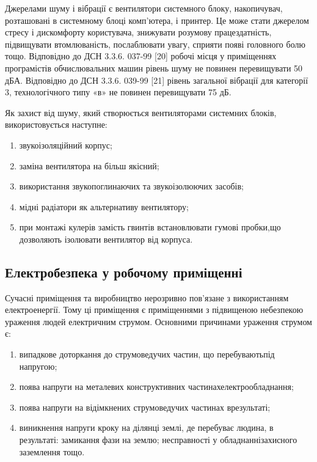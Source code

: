 Джерелами шуму і вібрації є вентилятори системного блоку, накопичувач, розташовані в системному блоці комп’ютера, і принтер. Це може стати джерелом стресу і дискомфорту користувача, знижувати розумову працездатність, підвищувати втомлюваність, послаблювати увагу, сприяти появі головного болю тощо. Відповідно до ДСН 3.3.6. 037-99 [20] робочі місця у приміщеннях програмістів обчислювальних машин рівень шуму не повинен перевищувати 50 дБА. Відповідно до ДСН 3.3.6. 039-99 [21] рівень загальної вібрації для категорії 3, технологічного типу «в» не повинен перевищувати 75 дБ.

Як захист від шуму, який створюється вентиляторами системних блоків, використовується наступне:

\begin{enumerate}
	\item звукоізоляційний корпус;
	\item заміна вентилятора на більш якісний;
	\item використання звукопоглинаючих та звукоізолюючих засобів;
	\item мідні радіатори як альтернативу вентилятору;
	\item при монтажі кулерів замість гвинтів встановлювати гумові пробки,\newline \hspace*{-18mm}що дозволяють ізолювати вентилятор від корпуса.
\end{enumerate}

\subsection{Електробезпека у робочому приміщенні}

Сучасні приміщення та виробництво нерозривно пов’язане з використанням електроенергії. Тому ці приміщення є приміщеннями з підвищеною небезпекою ураження людей електричним струмом. Основними причинами ураження струмом є:

\begin{enumerate}
	\item випадкове доторкання до струмоведучих частин, що перебувають\newline \hspace*{-18mm}під напругою;
	\item поява напруги на металевих конструктивних частинах\newline \hspace*{-18mm}електрообладнання;
	\item поява напруги на відімкнених струмоведучих частинах в\newline \hspace*{-18mm}результаті;
	\item виникнення напруги кроку на ділянці землі, де перебуває людина,\newline \hspace*{-18mm} в результаті: замикання фази на землю; несправності у обладнанні\newline \hspace*{-18mm}захисного заземлення тощо.
\end{enumerate}

